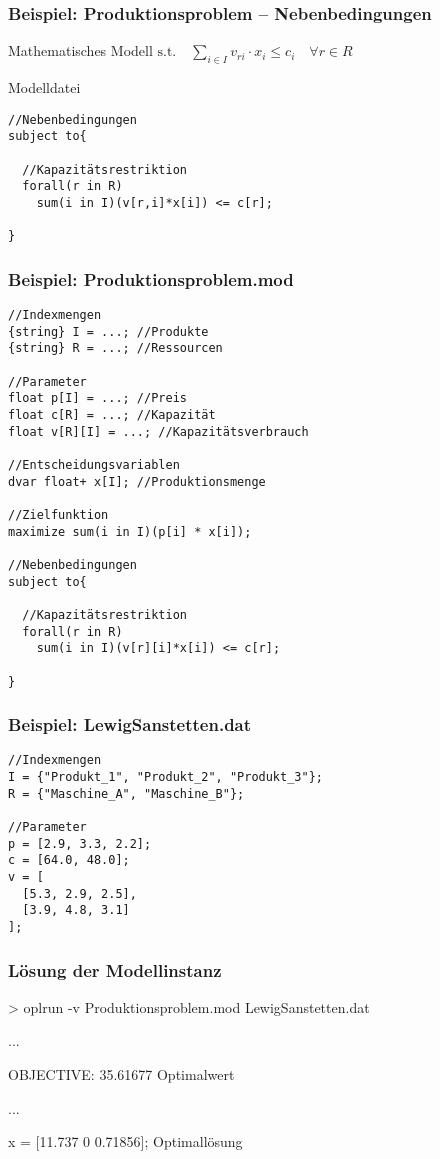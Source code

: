 \begin{frame}[fragile]\small
 \frametitle{Beispiel: Produktionsproblem -- Nebenbedingungen}
 \begin{block}{Mathematisches Modell}
  $\text{s.t.}\quad\displaystyle\sum_{i\in I} v_{ri}\cdot x_i \leq c_i  \quad\forall r\in R$
 \end{block}
 \begin{block}{Modelldatei}\scriptsize
\begin{lstlisting}[numbers=none]
//Nebenbedingungen
subject to{
  
  //Kapazitätsrestriktion
  forall(r in R)
    sum(i in I)(v[r,i]*x[i]) <= c[r];
  
}  
\end{lstlisting}
 \end{block}
\end{frame}

\begin{frame}[fragile]
 \frametitle{Beispiel: Produktionsproblem.mod}
 \medskip
\begin{lstlisting}[basicstyle=\scriptsize\ttfamily]
//Indexmengen
{string} I = ...; //Produkte
{string} R = ...; //Ressourcen

//Parameter
float p[I] = ...; //Preis
float c[R] = ...; //Kapazität
float v[R][I] = ...; //Kapazitätsverbrauch

//Entscheidungsvariablen
dvar float+ x[I]; //Produktionsmenge

//Zielfunktion
maximize sum(i in I)(p[i] * x[i]);

//Nebenbedingungen
subject to{
  
  //Kapazitätsrestriktion
  forall(r in R)
    sum(i in I)(v[r][i]*x[i]) <= c[r];
  
}   
\end{lstlisting}
\end{frame}

\begin{frame}[fragile]
 \frametitle{Beispiel: LewigSanstetten.dat}
 \medskip
\begin{lstlisting}[basicstyle=\scriptsize\ttfamily]
//Indexmengen
I = {"Produkt_1", "Produkt_2", "Produkt_3"}; 
R = {"Maschine_A", "Maschine_B"}; 
 
//Parameter
p = [2.9, 3.3, 2.2];
c = [64.0, 48.0];
v = [
  [5.3, 2.9, 2.5],
  [3.9, 4.8, 3.1]
]; 
\end{lstlisting}
\end{frame}

\begin{frame}
 \frametitle{Lösung der Modellinstanz}
 \ttfamily
 > oplrun -v Produktionsproblem.mod LewigSanstetten.dat
 \begin{center}
  \textsf ...
 \end{center}
 OBJECTIVE: 35.61677 \hfill\alert{\textsf{\textleftarrow{} Optimalwert}}
 \begin{center}
  \textsf ...
 \end{center}
 x = [11.737 0 0.71856]; \hfill\alert{\textsf{\textleftarrow{} Optimallösung}}
\end{frame}

